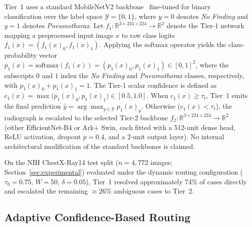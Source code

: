 \documentclass[diagnostics,article,submit,moreauthors]{Definitions/mdpi}
\newcommand{\rev}[1]{#1}
\begin{document}
Tier~1 uses a standard MobileNetV2 backbone~\cite{sandler2018mobilenetv2} fine-tuned for binary classification over the label space $\mathcal{Y} = \{0, 1\}$, where $y=0$ denotes \emph{No Finding} and $y=1$ denotes \emph{Pneumothorax}. \rev{Let $f_1 : \mathbb{R}^{3\times 224\times 224} \to \mathbb{R}^2$ denote the Tier-1 network mapping a preprocessed input image $x$ to raw class logits $f_1(x) = (f_1(x)_0, f_1(x)_1)$. Applying the softmax operator yields the class-probability vector $p_1(x) = \mathrm{softmax}(f_1(x)) = (p_1(x)_0, p_1(x)_1) \in [0,1]^2$, where the subscripts $0$ and $1$ index the \emph{No Finding} and \emph{Pneumothorax} classes, respectively, with $p_1(x)_0 + p_1(x)_1 = 1$.} The Tier-1 scalar confidence is defined as $c_1(x) = \max\big(p_1(x)_0, p_1(x)_1\big) \in [0.5, 1.0]$. When $c_1(x) \ge \tau_t$, Tier~1 emits the final prediction $\hat{y} = \arg\max_{y\in\mathcal{Y}} p_1(x)_y$. Otherwise ($c_1(x) < \tau_t$), the radiograph is escalated to the selected Tier-2 backbone $f_2 : \mathbb{R}^{3\times 224\times 224} \to \mathbb{R}^2$ (either EfficientNet-B4 or Ark+ Swin, each fitted with a 512-unit dense head, ReLU activation, dropout $p=0.4$, and a 2-unit output layer). No internal architectural modification of the standard backbones is claimed.

\rev{On the NIH ChestX-Ray14 test split ($n=4{,}772$ images; Section~\ref{sec:experimental}) evaluated under the dynamic routing configuration ($\tau_0=0.75$, $W=50$, $\delta=0.05$), Tier~1 resolved approximately 74\% of cases directly and escalated the remaining $\approx 26\%$ ambiguous cases to Tier~2.}

\subsection{Adaptive Confidence-Based Routing}
\end{document}
